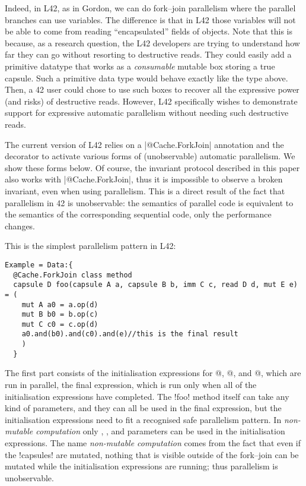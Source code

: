 Indeed, in L42, as in Gordon, we can do fork--join parallelism where the parallel branches can use \Q@capsule@ variables.
The difference is that in L42 those variables will not be able to come from reading ``encapsulated'' fields of \Q@mut@ objects.
Note that this is because, as a research question, the L42 developers are trying to understand how far they can go without resorting to destructive reads.
They could easily add a primitive datatype that works as a \emph{consumable} mutable box storing a true capsule. Such a primitive data type would behave exactly like the \Q@Box@ type above.
Then, a 42 user could chose to use such boxes to recover all the expressive power (and risks) of destructive reads.
However, L42 specifically wishes to demonstrate support for expressive automatic parallelism without needing such destructive reads.

The current version of L42 relies on a \Q|@Cache.ForkJoin| annotation and the \Q@Data@ decorator to activate various forms of (unobservable) automatic parallelism. We show these forms below.
Of course, the invariant protocol described in this paper also works with \Q|@Cache.ForkJoin|, thus it is impossible to observe a broken invariant, even when using parallelism. This is a direct result of the fact that parallelism in 42 is unobservable: the semantics of parallel code is equivalent to the semantics of the corresponding sequential code, only the performance changes.


This is the simplest parallelism pattern in L42:
\begin{lstlisting}[deletekeywords=label]
Example = Data:{
  @Cache.ForkJoin class method 
  capsule D foo(capsule A a, capsule B b, imm C c, read D d, mut E e) = (
    mut A a0 = a.op(d)
    mut B b0 = b.op(c)
    mut C c0 = c.op(d)
    a0.and(b0).and(c0).and(e)//this is the final result
    )
  }
\end{lstlisting}
The first part consists of the initialisation expressions for @, @, and 
@, which are run in parallel, the final expression, which is run only when 
all of the initialisation expressions have completed.
The \Q!foo! method itself can take any kind of parameters, and they can all be used in the final expression, but the initialisation expressions need to fit a recognised
safe parallelism pattern. In \emph{non-mutable computation} only \Q@read@, \Q@capsule@, and \Q@imm@ parameters can be used in the initialisation expressions.
The name \emph{non-mutable computation} comes from the fact that even if the \Q!capsules! are mutated, nothing that is visible outside of the fork--join can be mutated while the initialisation expressions are running; thus parallelism is unobservable.

